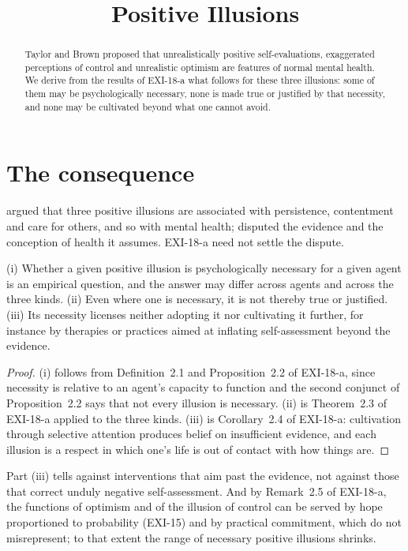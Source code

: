 \documentclass{situationist-preprint}
\title{Positive Illusions}
\begin{document}
\maketitle

\begin{abstract}
Taylor and Brown proposed that unrealistically positive self-evaluations, exaggerated perceptions of control and unrealistic optimism are features of normal mental health. We derive from the results of EXI-18-a what follows for these three illusions: some of them may be psychologically necessary, none is made true or justified by that necessity, and none may be cultivated beyond what one cannot avoid.
\end{abstract}

\section{The consequence}

\citet{Taylor1988} argued that three positive illusions are associated with persistence, contentment and care for others, and so with mental health; \citet{Colvin1994} disputed the evidence and the conception of health it assumes. EXI-18-a need not settle the dispute.

\begin{proposition}\label{p:pos}
(i) Whether a given positive illusion is psychologically necessary for a given agent is an empirical question, and the answer may differ across agents and across the three kinds. (ii) Even where one is necessary, it is not thereby true or justified. (iii) Its necessity licenses neither adopting it nor cultivating it further, for instance by therapies or practices aimed at inflating self-assessment beyond the evidence.
\end{proposition}

\begin{proof}
(i) follows from Definition~2.1 and Proposition~2.2 of EXI-18-a, since necessity is relative to an agent's capacity to function and the second conjunct of Proposition~2.2 says that not every illusion is necessary. (ii) is Theorem~2.3 of EXI-18-a applied to the three kinds. (iii) is Corollary~2.4 of EXI-18-a: cultivation through selective attention produces belief on insufficient evidence, and each illusion is a respect in which one's life is out of contact with how things are.
\end{proof}

Part (iii) tells against interventions that aim past the evidence, not against those that correct unduly negative self-assessment. And by Remark~2.5 of EXI-18-a, the functions of optimism and of the illusion of control can be served by hope proportioned to probability (EXI-15) and by practical commitment, which do not misrepresent; to that extent the range of necessary positive illusions shrinks.
\end{document}
